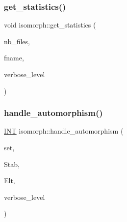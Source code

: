 \mbox{\label{classisomorph_a70c817cfed4be5d19ce2c902d161d184}} 
\subsubsection{\texorpdfstring{get\+\_\+statistics()}{get\_statistics()}}
{\footnotesize\ttfamily void isomorph\+::get\+\_\+statistics (\begin{DoxyParamCaption}\item[{\mbox{\hyperlink{galois_8h_a09fddde158a3a20bd2dcadb609de11dc}{I\+NT}}}]{nb\+\_\+files,  }\item[{const \mbox{\hyperlink{galois_8h_ab6cc7b4aeb6ea31aba2b3fbfc83ff5e6}{B\+Y\+TE}} $\ast$$\ast$}]{fname,  }\item[{\mbox{\hyperlink{galois_8h_a09fddde158a3a20bd2dcadb609de11dc}{I\+NT}}}]{verbose\+\_\+level }\end{DoxyParamCaption})}

\mbox{\label{classisomorph_a95e0ae39f992234f7cbeb6f1d57d82df}} 
\subsubsection{\texorpdfstring{handle\+\_\+automorphism()}{handle\_automorphism()}}
{\footnotesize\ttfamily \mbox{\hyperlink{galois_8h_a09fddde158a3a20bd2dcadb609de11dc}{I\+NT}} isomorph\+::handle\+\_\+automorphism (\begin{DoxyParamCaption}\item[{\mbox{\hyperlink{galois_8h_a09fddde158a3a20bd2dcadb609de11dc}{I\+NT}} $\ast$}]{set,  }\item[{\mbox{\hyperlink{classsims}{sims}} $\ast$}]{Stab,  }\item[{\mbox{\hyperlink{galois_8h_a09fddde158a3a20bd2dcadb609de11dc}{I\+NT}} $\ast$}]{Elt,  }\item[{\mbox{\hyperlink{galois_8h_a09fddde158a3a20bd2dcadb609de11dc}{I\+NT}}}]{verbose\+\_\+level }\end{DoxyParamCaption})}

\mbox{\label{classisomorph_ad26de5e1bd7bae03d375163fd4c30775}} 
